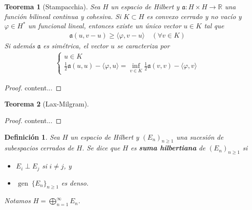 \documentclass[11pt]{report}
\theoremstyle{colored}
\newtheorem{definition}{Definición}[section]
\newtheorem{theorem}{Teorema}[section]
\newcommand{\R}{\mathbb{R}}
\newcommand{\paint}[1]{\color{color}{#1}}
\begin{document}
\begin{theorem}[Stampacchia] Sea $H$ un espacio de Hilbert y $\mathfrak{a} : H \times H \to \R$ una función bilineal continua y cohesiva. Si $K \subset H$ es convexo cerrado y no vacío y $\varphi \in H^*$ un funcional lineal, entonces existe un único vector $u \in K$ tal que
\begin{align*}
\mathfrak{a}(u,v-u) \geq \langle \varphi, v-u \rangle \quad (\forall v \in K)
\end{align*}
Si además $\mathfrak{a}$ es simétrica, el vector $u$ se caracteriza por
\begin{align*}
\begin{cases}
u \in K\\
\frac{1}{2}\mathfrak{a}(u,u) - \langle \varphi, u \rangle = \inf_{v \in K}\frac{1}{2}\mathfrak{a}(v,v) - \langle \varphi, v \rangle
\end{cases}
\end{align*}
\end{theorem}
\begin{proof}
content...
\end{proof}

\begin{theorem}[Lax-Milgram]
\end{theorem}
\begin{proof}
content...
\end{proof}

\begin{definition} Sea $H$ un espacio de Hilbert y $(E_n)_{n \geq 1}$ una sucesión de subespacios cerrados de $H$. Se dice que $H$ es \textbf{suma hilbertiana} de $(E_n)_{n \geq 1}$ si 
\begin{itemize}
\item[$\paint{\bullet}$] $E_i \perp E_j$ si $i \neq j$, y
\item[$\paint{\bullet}$] $\operatorname{gen} \ \{E_n\}_{n \geq 1}$ es denso.
\end{itemize}
Notamos $H = \bigoplus_{n = 1}^\infty E_n$.
\end{definition}
\end{document}
